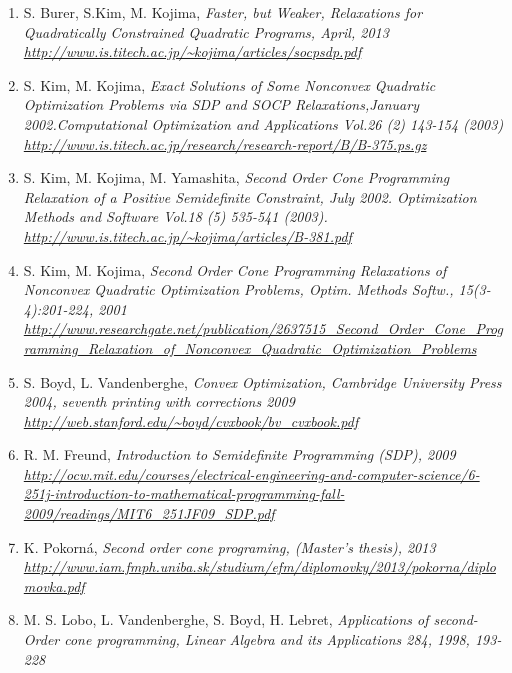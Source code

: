 \documentclass[10pt,oneside]{book}
\theoremstyle{definition}
\begin{document}
\begin{enumerate}
\renewcommand*\labelenumi{[\theenumi]}

%
\item S. Burer, S.Kim, M. Kojima, \it Faster, but Weaker, Relaxations for Quadratically Constrained Quadratic Programs, \rm April, 2013 \\
\url{http://www.is.titech.ac.jp/~kojima/articles/socpsdp.pdf}
\label{BurerKimKojimaFasterWeakerRelax}
%
\item S. Kim, M. Kojima, \it Exact Solutions of Some Nonconvex Quadratic Optimization Problems via SDP and SOCP Relaxations,\rm January 2002.Computational Optimization and Applications Vol.26 (2) 143-154 (2003)\\
\url{http://www.is.titech.ac.jp/research/research-report/B/B-375.ps.gz}
\label{KimKojimaExactSolViaSDPandSOCP}
%
\item S. Kim, M. Kojima, M. Yamashita, \it Second Order Cone Programming Relaxation of a Positive Semidefinite Constraint, \rm July 2002. Optimization Methods and Software Vol.18 (5) 535-541 (2003).\\
\url{http://www.is.titech.ac.jp/~kojima/articles/B-381.pdf}
\label{KimKojimaSOCPRelaxOfPSDconstr}
%
\item S. Kim, M. Kojima, \it Second Order Cone Programming Relaxations of Nonconvex Quadratic Optimization Problems, \rm Optim. Methods Softw., 15(3-4):201-224, 2001 \\
\url{http://www.researchgate.net/publication/2637515_Second_Order_Cone_Programming_Relaxation_of_Nonconvex_Quadratic_Optimization_Problems}
\label{KimKojimaSOCPofNoncvxQOP}
%
\item S. Boyd, L. Vandenberghe, \it Convex Optimization, \rm Cambridge University Press 2004, seventh printing with corrections 2009 \\
\url{http://web.stanford.edu/~boyd/cvxbook/bv_cvxbook.pdf}
\label{BoydCvxOpt}
%
\item R. M. Freund, \it Introduction to Semidefinite Programming (SDP), \rm 2009 \\ \url{http://ocw.mit.edu/courses/electrical-engineering-and-computer-science/6-251j-introduction-to-mathematical-programming-fall-2009/readings/MIT6_251JF09_SDP.pdf}
\label{FreundIntroSDP}
%
\item K. Pokorná, \it Second order cone programing, (Master's thesis), \rm 2013 \\
\url{http://www.iam.fmph.uniba.sk/studium/efm/diplomovky/2013/pokorna/diplomovka.pdf}
\label{PokornaSOCPDipl}
%
\item M. S. Lobo, L. Vandenberghe, S. Boyd, H. Lebret, \it Applications of second-Order cone programming, \rm Linear Algebra and its Applications 284, 1998, 193-228\\

\end{enumerate}
\end{document}
